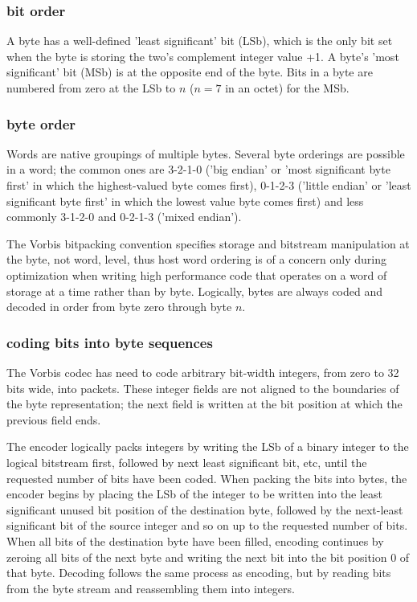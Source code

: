 \subsubsection{bit order}

A byte has a well-defined 'least significant' bit (LSb), which is the
only bit set when the byte is storing the two's complement integer
value +1.  A byte's 'most significant' bit (MSb) is at the opposite
end of the byte. Bits in a byte are numbered from zero at the LSb to
$n$ ($n=7$ in an octet) for the
MSb.



\subsubsection{byte order}

Words are native groupings of multiple bytes.  Several byte orderings
are possible in a word; the common ones are 3-2-1-0 ('big endian' or
'most significant byte first' in which the highest-valued byte comes
first), 0-1-2-3 ('little endian' or 'least significant byte first' in
which the lowest value byte comes first) and less commonly 3-1-2-0 and
0-2-1-3 ('mixed endian').

The Vorbis bitpacking convention specifies storage and bitstream
manipulation at the byte, not word, level, thus host word ordering is
of a concern only during optimization when writing high performance
code that operates on a word of storage at a time rather than by byte.
Logically, bytes are always coded and decoded in order from byte zero
through byte $n$.



\subsubsection{coding bits into byte sequences}

The Vorbis codec has need to code arbitrary bit-width integers, from
zero to 32 bits wide, into packets.  These integer fields are not
aligned to the boundaries of the byte representation; the next field
is written at the bit position at which the previous field ends.

The encoder logically packs integers by writing the LSb of a binary
integer to the logical bitstream first, followed by next least
significant bit, etc, until the requested number of bits have been
coded.  When packing the bits into bytes, the encoder begins by
placing the LSb of the integer to be written into the least
significant unused bit position of the destination byte, followed by
the next-least significant bit of the source integer and so on up to
the requested number of bits.  When all bits of the destination byte
have been filled, encoding continues by zeroing all bits of the next
byte and writing the next bit into the bit position 0 of that byte.
Decoding follows the same process as encoding, but by reading bits
from the byte stream and reassembling them into integers.




